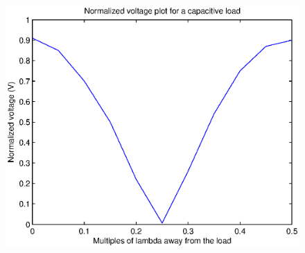 \documentclass{article}
\begin{document}
\begin{figure}[H]
	\centering
   	\includegraphics[scale = 0.85]{./Matlab/Capacitive.eps}
\end{figure}
\end{document}
